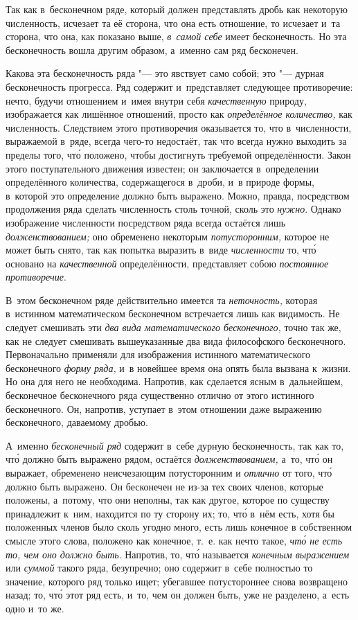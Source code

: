 Так как в~бесконечном ряде, который должен представлять дробь как некоторую
численность, исчезает та её сторона, что она есть отношение, то исчезает и~та
сторона, что она, как показано выше, {\em в~самой себе} имеет бесконечность. Но
эта бесконечность вошла другим образом, а~именно сам ряд бесконечен.

Какова эта бесконечность ряда "--- это явствует само собой; это "--- дурная
бесконечность прогресса. Ряд содержит и~представляет следующее
противоречие: нечто, будучи отношением и~имея внутри себя
{\em качественную} природу, изображается как лишённое отношений, просто как
{\em определённое количество,} как численность. Следствием
этого противоречия оказывается то, что в~численности, выражаемой в~ряде, всегда
чего-то недостаёт, так что всегда нужно выходить за пределы того, чт\'{о} положено,
чтобы достигнуть требуемой определённости. Закон этого поступательного движения
известен; он заключается в~определении определённого количества, содержащегося
в~дроби, и~в природе формы, в~которой это определение должно быть выражено. Можно,
правда, посредством продолжения ряда сделать численность столь точной,
сколь это {\em нужно}. Однако изображение численности посредством ряда всегда
остаётся лишь {\em долженствованием;} оно обременено некоторым
{\em потусторонним,} которое не может быть снято, так как попытка выразить в~виде
{\em численности} то, чт\'{о} основано на {\em качественной} определённости,
представляет собою {\em постоянное противоречие}.

\label{bkm:bm52a}В~этом бесконечном ряде действительно имеется
та {\em неточность,} которая в~истинном математическом бесконечном
встречается лишь как видимость. Не следует смешивать
эти {\em два вида математического бесконечного,} точно так же, как
не следует смешивать вышеуказанные два вида философского
бесконечного. Первоначально применяли для изображения истинного
математического бесконечного {\em форму ряда,} и~в новейшее время она опять
была вызвана к~жизни. Но она для него не необходима. Напротив, как сделается
ясным в~дальнейшем, бесконечное бесконечного ряда существенно отлично от этого
истинного бесконечного. Он, напротив, уступает в~этом отношении даже выражению
бесконечного, даваемому дробью.

А~именно {\em бесконечный ряд} содержит в~себе дурную бесконечность, так как
то, чт\'{о} должно быть выражено рядом, остаётся {\em долженствованием,} а~то,
чт\'{о} он выражает, обременено неисчезающим потусторонним и {\em отлично} от
того, чт\'{о} должно быть выражено. Он бесконечен не из-за тех своих членов,
которые положены, а~потому, что они неполны, так как другое, которое по
существу принадлежит к~ним, находится по ту сторону их; то, чт\'{о} в~нём есть,
хотя бы положенных членов было сколь угодно много, есть лишь конечное в
собственном смысле этого слова, положено как конечное, т.~е. как нечто такое,
{\em чт\'{о} не есть то, чем оно должно быть}. Напротив, то, чт\'{о} называется
{\em конечным выражением} или {\em суммой} такого ряда, безупречно; оно
содержит в~себе полностью то значение, которого ряд только ищет; убегавшее
потустороннее снова возвращено назад; то, чт\'{о} этот ряд есть, и~то, чем он
должен быть, уже не разделено, а~есть одно и~то же.

